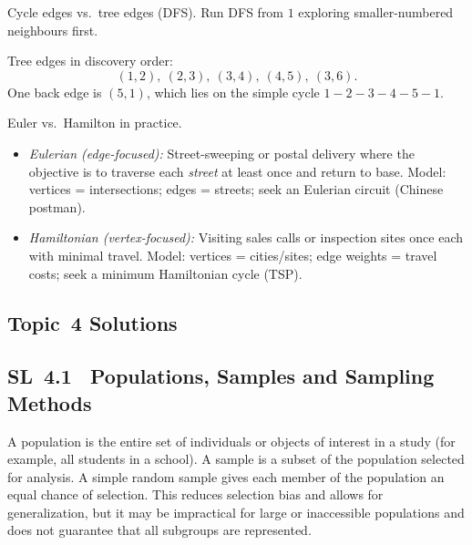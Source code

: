 \documentclass[11pt]{article}
\def\textbf#1{#1}%
\newcommand{\tocsubsection}[1]{\subsection{#1}}
\begin{document}
\begin{solution}
\textbf{Cycle edges vs.\ tree edges (DFS).}
Run DFS from $1$ exploring smaller-numbered neighbours first.

\begin{center}
\end{center}

Tree edges in discovery order:
\[
(1,2),\ (2,3),\ (3,4),\ (4,5),\ (3,6).
\]
One back edge is $(5,1)$, which lies on the simple cycle $1\!-\!2\!-\!3\!-\!4\!-\!5\!-\!1$.
\end{solution}

\begin{solution}
\textbf{Euler vs.\ Hamilton in practice.}
\begin{itemize}
  \item \emph{Eulerian (edge-focused):} Street-sweeping or postal delivery where the objective is to traverse each \emph{street} at least once and return to base. Model: vertices = intersections; edges = streets; seek an Eulerian circuit (Chinese postman).
  \item \emph{Hamiltonian (vertex-focused):} Visiting sales calls or inspection sites once each with minimal travel. Model: vertices = cities/sites; edge weights = travel costs; seek a minimum Hamiltonian cycle (TSP).
\end{itemize}
\end{solution}



\tocsubsection{Topic 4 Solutions}

\tocsubsection{SL 4.1 \; Populations, Samples and Sampling Methods}

\begin{solution}
A population is the entire set of individuals or objects of interest in a
study (for example, all students in a school).  A sample is a subset of the
population selected for analysis.  A simple random sample gives each member
of the population an equal chance of selection.  This reduces selection bias
and allows for generalization, but it may be impractical for large or
inaccessible populations and does not guarantee that all subgroups are
represented.
\end{solution}
\end{document}
